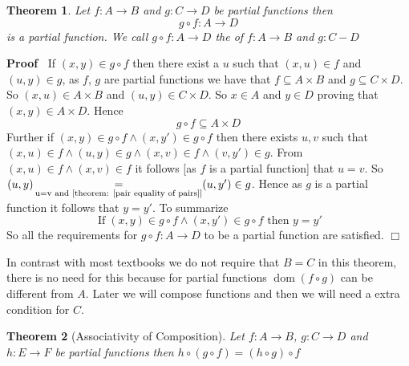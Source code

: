 \documentclass{book}
\newcommand{\equallim}{\mathop{=}\limits}
\newcommand{\tmop}[1]{\ensuremath{\operatorname{#1}}}
\newcommand{\tmtextbf}[1]{\text{{\bfseries{#1}}}}
\newenvironment{proof}{\noindent\textbf{Proof\ }}{\hspace*{\fill}$\Box$\medskip}
\newtheorem{theorem}{Theorem}
\begin{document}
\begin{theorem}
  \label{partial function composition of partial functions}Let $f : A
  \rightarrow B$ and $g : C \rightarrow D$ be partial functions then
  \[ g \circ f : A \rightarrow D \]
  is a partial function. We call $g \circ f : A \rightarrow D$ the
  \tmtextbf{composiiton} of $f : A \rightarrow B$ and $g : C - D$
\end{theorem}

\begin{proof}
  If $(x, y) \in g \circ f$ then there exist a $u$ such that $(x, u) \in f$
  and $(u, y) \in g$, as $f$, $g$ are partial functions we have that $f
  \subseteq A \times B$ and $g \subseteq C \times D$. So $(x, u) \in A \times
  B$ and $(u, y) \in C \times D$. So $x \in A$ and $y \in D$ proving that $(x,
  y) \in A \times D$. Hence
  \[ g \circ f \subseteq A \times D \]
  Further if $(x, y) \in g \circ f \wedge (x, y') \in g \circ f$ then there
  exists $u, v$ such that $(x, u) \in f \wedge (u, y) \in g \wedge (x, v) \in
  f \wedge (v, y') \in g$. From $(x, u) \in f \wedge (x, v) \in f$ it follows
  [as $f$ is a partial function] that $u = v$. So $(u, y) \equallim_{\text{u=v
  and [theorem: \ref{pair equality of pairs}]}} (u, y') \in g$. Hence as $g$
  is a partial function it follows that $y = y'$. To summarize
  \[ \tmop{If} (x, y) \in g \circ f \wedge (x, y') \in g \circ f \text{ then }
     y = y' \]
  So all the requirements for $g \circ f : A \rightarrow D$ to be a partial
  function are satisfied.
\end{proof}

\begin{note}
  In contrast with most textbooks we do not require that $B = C$ in this
  theorem, there is no need for this because for partial functions $\tmop{dom}
  (f \circ g)$ can be different from $A$. Later we will compose functions and
  then we will need a extra condition for $C$.
\end{note}

\begin{theorem}[Associativity of Composition]
  \label{partial function associativity}Let $f : A \rightarrow B$, $g : C
  \rightarrow D$ and $h : E \rightarrow F$ be partial functions then $h \circ
  (g \circ f) = (h \circ g) \circ f$
\end{theorem}
\end{document}
